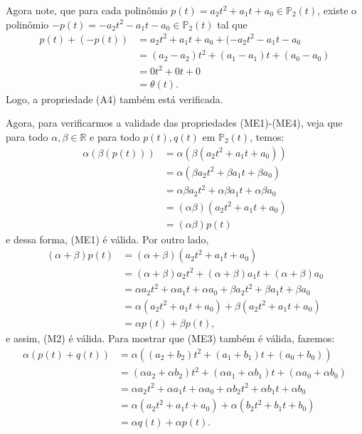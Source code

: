 \begin{enumerate}
Agora note, que para cada polinômio $p(t)=a_2t^2+a_1t+a_0 \in \mathbb{P}_2(t)$, existe o polinômio $-p(t)=-a_2t^2-a_1t-a_0 \in \mathbb{P}_2(t)$ tal que
\begin{align*}
p(t)+(-p(t))&=a_2t^2+a_1t+a_0+( -a_2t^2-a_1t-a_0\\
               &=(a_2-a_2)t^2+(a_1-a_1)t+(a_0-a_0)\\
               &=0t^2+0t+0\\
               &=\theta (t).
\end{align*}
Logo, a propriedade (A4) também está verificada.

Agora, para verificarmos a validade das propriedades (ME1)-(ME4), veja que para todo $\alpha, \beta \in \mathbb{R}$ e para todo $p(t), q(t)$ em $\mathbb{P}_2(t)$, temos:
\begin{align*}
\alpha(\beta (p(t)))&=\alpha( \beta (a_2t^2+a_1t+a_0))\\
               &=\alpha( \beta a_2t^2+\beta a_1t+\beta a_0)\\
               &=\alpha \beta a_2t^2+\alpha \beta a_1t+\alpha \beta a_0\\
               &=(\alpha \beta )(a_2t^2+ a_1t+ a_0)\\
               &=(\alpha \beta )p(t)
\end{align*}
e dessa forma, (ME1) é válida. Por outro lado,
\begin{align*}
(\alpha+\beta) p(t)&=(\alpha+\beta) (a_2t^2+a_1t+a_0)\\
               &=(\alpha+\beta)a_2t^2+(\alpha+\beta) a_1t+(\alpha+\beta) a_0\\
              &= \alpha a_2t^2+ \alpha a_1t+\alpha a_0  +\beta a_2t^2+\beta a_1t+\beta a_0\\
               &= \alpha (a_2t^2+  a_1t+ a_0 )+\beta (a_2t^2+ a_1t+ a_0)\\
               &=\alpha p(t)+ \beta p(t),
\end{align*}
e assim, (M2) é válida. Para mostrar que (ME3) também é válida, fazemos:
\begin{align*}
\alpha(p(t)+q(t))&=\alpha((a_2+b_2)t^2+(a_1+b_1)t+(a_0+b_0))\\
               &=(\alpha a_2+\alpha b_2)t^2+(\alpha a_1+\alpha b_1)t+(\alpha a_0+\alpha b_0)\\
               &=\alpha a_2 t^2 + \alpha a_1t+ \alpha a_0 + \alpha b_2t^2+\alpha b_1t+ \alpha b_0\\
               &=\alpha ( a_2 t^2 + a_1t+ a_0 )+ \alpha ( b_2t^2+ b_1t+ b_0)\\
               &=\alpha q(t)+\alpha p(t).
\end{align*}


\end{enumerate}
